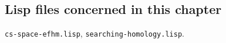 \subsection* {Lisp files concerned in this chapter}

{\tt cs-space-efhm.lisp}, {\tt searching-homology.lisp}.
